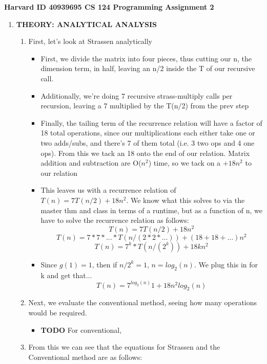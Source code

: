 \documentclass[11pt]{article}
\begin{document}
\textbf{Harvard ID 40939695 CS 124 Programming Assignment 2}

\begin{enumerate}
    \item \textbf{THEORY: ANALYTICAL ANALYSIS}

    \begin{enumerate}
    
        \begin{enumerate}
            \item First, let's look at Strassen analytically
            \begin{itemize}
                \item First, we divide the matrix into four pieces, thus cutting our n, the dimension term, in half, leaving an n/2 inside the T of our recursive call.
                \item Additionally, we're doing 7 recursive strass-multiply calls per recursion, leaving a 7 multiplied by the T(n/2) from the prev step
                \item Finally, the tailing term of the recurrence relation will have a factor of  18 total operations, since our multiplications each either take one or two adds/subs, and there's 7 of them total (i.e. 3 two ops and 4 one ops). From this we tack an 18 onto the end of our relation. Matrix addition and subtraction are O($n^2$) time, so we tack on a $+ 18n^2$ to our relation
                \item This leaves us with a recurrence relation of $T(n) = 7T(n/2) + 18n^2$. We know what this solves to via the master thm and class in terms of a runtime, but as a function of n, we have to solve the recurrence relation as follows:
                $$ T(n) = 7T(n/2)+18n^2 $$
                $$ T(n) = 7*7*...*T(n/(2*2*...))+(18+18+...)n^2 $$
                $$ T(n) = 7^k*T(n/(2^k))+18kn^2 $$
                \item Since $g(1) = 1$, then if $n/2^k = 1$, $n = log_2(n)$. We plug this in for k and get that...
                $$ T(n) = 7^{log_2(n)}1+18n^2log_2(n) $$
            \end{itemize}
            \item Next, we evaluate the conventional method, seeing how many operations would be required.
            \begin{itemize}
                \item \textbf{TODO} For conventional, 
            \end{itemize}
            \item From this we can see that the equations for Strassen and the Conventional method are as follows:

\end{enumerate}
\end{enumerate}
\end{enumerate}
\end{document}

